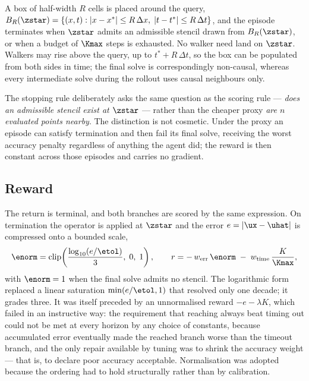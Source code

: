 A box of half-width $R$ cells is placed around the query,
$B_R(\zstar) = \{(x,t) : |x - x^*| \le R\,\Delta x,\; |t - t^*| \le R\,\Delta t\}$,
and the episode terminates when $\zstar$ admits an admissible stencil drawn
from $B_R(\zstar)$, or when a budget of $\Kmax$ steps is exhausted. No walker
need land on $\zstar$. Walkers may rise above the query, up to
$t^* + R\,\Delta t$, so the box can be populated from both sides in time; the
final solve is correspondingly non-causal, whereas every intermediate solve
during the rollout uses causal neighbours only.

The stopping rule deliberately asks the same question as the scoring rule
--- \emph{does an admissible stencil exist at $\zstar$} --- rather than the
cheaper proxy \emph{are $n$ evaluated points nearby}. The distinction is not
cosmetic. Under the proxy an episode can satisfy termination and then fail
its final solve, receiving the worst accuracy penalty regardless of anything
the agent did; the reward is then constant across those episodes and carries
no gradient. 

\subsection{Reward}
\label{sec:mdp_reward}

The return is terminal, and both branches are scored by the same expression.
On termination the operator is applied at $\zstar$ and the error
$e = |\ux - \uhat|$ is compressed onto a bounded scale,
\begin{equation}
  \enorm = \mathrm{clip}\!\left(
    \frac{\log_{10}(e / \etol)}{3},\; 0,\; 1 \right),
  \qquad
  r = -\,w_{\mathrm{err}}\,\enorm \;-\; w_{\mathrm{time}}\,\frac{K}{\Kmax},
  \label{eq:reward}
\end{equation}
with $\enorm = 1$ when the final solve admits no stencil. The logarithmic
form replaced a linear saturation $\min(e/\etol, 1)$ that resolved only one
decade; it grades three. It was itself preceded by an unnormalised reward
$-e - \lambda K$, which failed in an instructive way: the requirement that
reaching always beat timing out could not be met at every horizon by any
choice of constants, because accumulated error eventually made the reached
branch worse than the timeout branch, and the only repair available by tuning
was to shrink the accuracy weight --- that is, to declare poor accuracy
acceptable. Normalisation was adopted because the ordering had to hold
structurally rather than by calibration.

